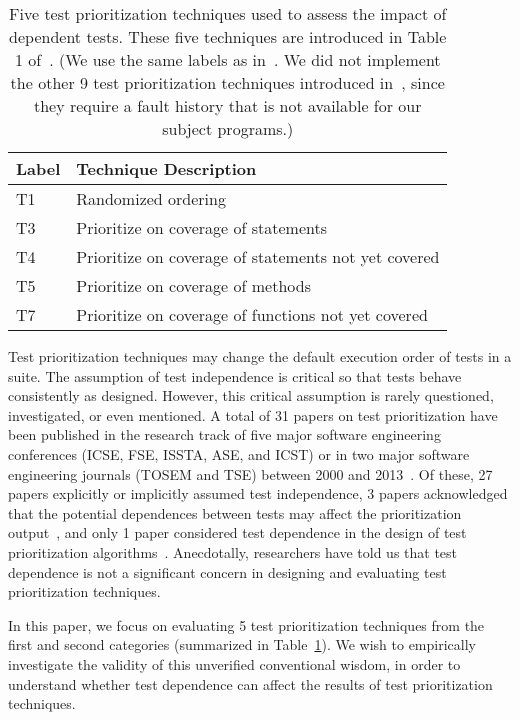 \begin{table}
\centering
\setlength{\tabcolsep}{0.25\tabcolsep}
\begin{tabular}{|l|l|}
\hline
\textbf{Label} & \textbf{Technique Description} \\
\hline
T1 & Randomized ordering \\
T3 & Prioritize on coverage of statements \\
T4 & Prioritize on coverage of statements not yet covered\\
T5 & Prioritize on coverage of methods\\
T7 & Prioritize on coverage of functions not yet covered \\
\hline
\end{tabular}
\caption{Five test prioritization techniques used
to assess the impact of dependent tests. These five
techniques are introduced in Table 1
of~\cite{Elbaum:2000:PTC:347324.348910}. (We use
the same labels as in~\cite{Elbaum:2000:PTC:347324.348910}. We did not
implement the other 9 test prioritization techniques
introduced in~\cite{Elbaum:2000:PTC:347324.348910}, since
they require a fault history that is not
available for our subject programs.)
}
\label{tab:testprio}
\end{table}



Test prioritization techniques
may change the default execution order of tests in a suite.
The assumption of test independence 
is critical so that tests behave consistently
as designed.  However, this critical assumption is
rarely questioned, investigated, or even mentioned.
A total of 31 papers on test prioritization have been  
published in the research track of five major software
engineering conferences
(ICSE, FSE, ISSTA, ASE, and ICST) or in two major
software engineering journals
(TOSEM and TSE) between 2000 and 2013~\cite{alltestprior}.
Of these,
27 papers explicitly or implicitly assumed test independence,
3 papers acknowledged that the potential dependences between tests
may affect the prioritization output~\cite{Kim:2002:HTP:581339.581357,
Qu:2008:CRT, Rothermel:2004:TSC},
and only 1 paper considered test dependence in the design of
test prioritization algorithms~\cite{10.1109/TSE.2012.26}.
Anecdotally, researchers have told us that test dependence
is not a significant concern in designing and evaluating
test prioritization techniques. 


In this paper, we focus on evaluating 5 test prioritization
techniques from the first and second categories (summarized
in Table~\ref{tab:testprio}).
We wish to empirically investigate the validity of this unverified
conventional wisdom, in order to understand whether
test dependence can affect the results of test prioritization
techniques.



